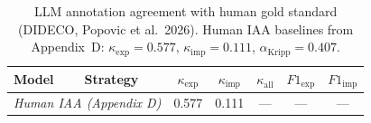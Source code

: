 \begin{table}[t]
\centering
\caption{LLM annotation agreement with human gold standard (DIDECO, Popovic et al.\ 2026). Human IAA baselines from Appendix~D: $\kappa_{\text{exp}}=0.577$, $\kappa_{\text{imp}}=0.111$, $\alpha_{\text{Kripp}}=0.407$.}
\label{tab:main_results}
\begin{tabular}{llccccc}
\toprule
Model & Strategy & $\kappa_{\text{exp}}$ & $\kappa_{\text{imp}}$ & $\kappa_{\text{all}}$ & $F1_{\text{exp}}$ & $F1_{\text{imp}}$ \\
\midrule
\midrule
\multicolumn{2}{l}{\textit{Human IAA (Appendix D)}} & 0.577 & 0.111 & --- & --- & --- \\
\bottomrule
\end{tabular}
\end{table}